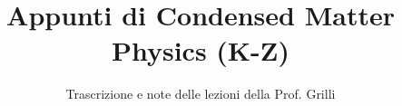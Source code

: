 \documentclass[a4paper,12pt]{article}
\title{Appunti di Condensed Matter Physics (K-Z)}
\author{Trascrizione e note delle lezioni della Prof. Grilli}
\date{}
\begin{document}
\maketitle
\projectintro
\tableofcontents
\newpage

\end{document}
